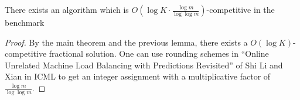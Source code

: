 \begin{theorem}
There exists an algorithm which is $O(\log K \cdot \frac{\log m}{ \log \log m})$-competitive in the benchmark
\end{theorem}
%
\begin{proof}
By the main theorem and the previous lemma, there exists a $O(\log K)$-competitive fractional solution. 
One can use rounding schemes in ``Online Unrelated Machine Load Balancing with Predictions Revisited'' of Shi Li and Xian in ICML to get an integer assignment with a multiplicative factor of $\frac{\log m}{ \log \log m}$. 
\end{proof}
